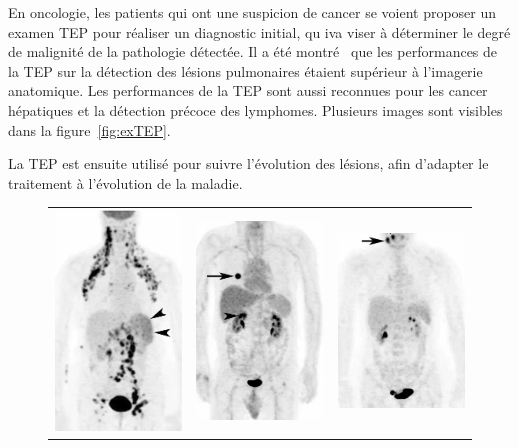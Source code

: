 En oncologie, les patients qui ont une suspicion de cancer se voient proposer un examen TEP pour réaliser un diagnostic initial, qu iva viser à déterminer le degré de malignité de la pathologie détectée. Il a été montré~\cite{gould2001accuracy} que les performances de la TEP sur la détection des lésions pulmonaires étaient supérieur à l'imagerie anatomique. Les performances de la TEP sont aussi reconnues pour les cancer hépatiques et la détection précoce des lymphomes. Plusieurs images sont visibles dans la figure~\ref{fig:exTEP}.

La TEP est ensuite utilisé pour suivre l'évolution des lésions, afin d'adapter le traitement à l'évolution de la maladie.

\begin{figure}[h!]
\centering
\begin{tabular}{c c c}
\includegraphics[width=5cm]{images/ex_lymphome} & \includegraphics[width=5cm]{images/ex_poumon} & \includegraphics[width=5cm]{images/ex_cou} \\

\end{tabular}
\end{figure}
